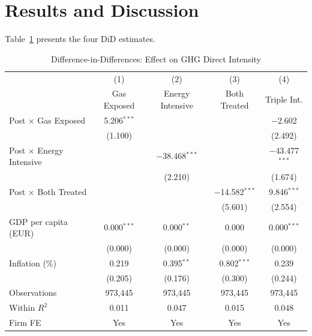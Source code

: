\documentclass[12pt,a4paper]{article}
\begin{document}
\section{Results and Discussion}
\label{sec:results}

Table~\ref{tab:did} presents the four DiD estimates.

\begin{table}[H]
\centering
\small
\caption{Difference-in-Differences: Effect on GHG Direct Intensity}
\label{tab:did}
\begin{tabular}{lcccc}
\toprule
 & (1) & (2) & (3) & (4) \\
 & Gas Exposed & Energy Intensive & Both Treated & Triple Int. \\
\midrule
Post $\times$ Gas Exposed         & 5.206$^{***}$ &               &                & $-$2.602 \\
                                   & (1.100)        &               &                & (2.492) \\[2pt]
Post $\times$ Energy Intensive    &               & $-$38.468$^{***}$ &            & $-$43.477$^{***}$ \\
                                   &               & (2.210)           &            & (1.674) \\[2pt]
Post $\times$ Both Treated        &               &               & $-$14.582$^{***}$ & 9.846$^{***}$ \\
                                   &               &               & (5.601)           & (2.554) \\[2pt]
GDP per capita (EUR)               & 0.000$^{***}$ & 0.000$^{**}$  & 0.000          & 0.000$^{***}$ \\
                                   & (0.000)       & (0.000)       & (0.000)        & (0.000) \\[2pt]
Inflation (\%)                    & 0.219         & 0.395$^{**}$  & 0.802$^{***}$  & 0.239 \\
                                   & (0.205)       & (0.176)       & (0.300)        & (0.244) \\[2pt]
\midrule
Observations   & 973,445 & 973,445 & 973,445 & 973,445 \\
Within $R^2$   & 0.011   & 0.047   & 0.015   & 0.048 \\
Firm FE        & Yes     & Yes     & Yes     & Yes \\

\end{tabular}
\end{table}
\end{document}
